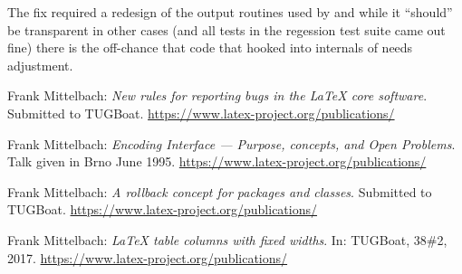 \documentclass{ltnews}
\begin{document}
The fix required a redesign of the output routines used by
 and while it ``should'' be transparent in other cases
(and all tests in the regession test suite came out fine) there is the
off-chance that code that hooked into internals of 
needs adjustment.



\begin{thebibliography}{9}
  
 Frank Mittelbach:
  \emph{New rules for reporting bugs in the \LaTeX{} core software}.  
  Submitted to TUGBoat.
  \url{https://www.latex-project.org/publications/}

 Frank Mittelbach:
  \emph{\LaTeXe{} Encoding Interface --- Purpose, concepts, and 
   Open Problems}.  
  Talk given in Brno June 1995.
  \url{https://www.latex-project.org/publications/}

 Frank Mittelbach:
  \emph{A rollback concept for packages and classes}.  
  Submitted to TUGBoat.
  \url{https://www.latex-project.org/publications/}

 Frank Mittelbach:
  \emph{\LaTeX{} table columns with fixed widths}.  
  In: TUGBoat, 38\#2, 2017.
  \url{https://www.latex-project.org/publications/}

\end{thebibliography}
\end{document}
